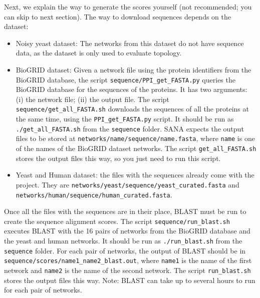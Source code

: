 \documentclass[]{article}
\begin{document}
Next, we explain the way to generate the scores yourself (not recommended; you can skip to next section). The way to download sequences depends on the dataset:
\begin{itemize}
\item Noisy yeast dataset: The networks from this dataset do not have sequence data, as the dataset is only used to evaluate topology.
\item BioGRID dataset: Given a network file using the protein identifiers from the BioGRID database, the script \texttt{sequence/PPI\_get\_FASTA.py} queries the BioGRID database for the sequences of the proteins. It has two arguments: (i) the network file; (ii) the output file. The script \texttt{sequence/get\_all\_FASTA.sh} downloads the sequences of all the proteins at the same time, using the \texttt{PPI\_get\_FASTA.py} script. It should be run as \texttt{./get\_all\_FASTA.sh} from the \texttt{sequence} folder. SANA expects the output files to be stored at \texttt{networks/name/sequence/name.fasta}, where \texttt{name} is one of the names of the BioGRID dataset networks. The script \texttt{get\_all\_FASTA.sh} stores the output files this way, so you just need to run this script.
\item Yeast and Human dataset: the files with the sequences already come with the project. They are \texttt{networks/yeast/sequence/yeast\_curated.fasta} and\\ \texttt{networks/human/sequence/human\_curated.fasta}.
\end{itemize}

Once all the files with the sequences are in their place, BLAST must be run to create the sequence alignment scores. The script \texttt{sequence/run\_blast.sh} executes BLAST with the 16 pairs of networks from the BioGRID database and the yeast and human networks. It should be run as \texttt{./run\_blast.sh} from the \texttt{sequence} folder. For each pair of networks, the output of BLAST should be in \texttt{sequence/scores/name1\_name2\_blast.out}, where \texttt{name1} is the name of the first network and \texttt{name2} is the name of the second network. The script \texttt{run\_blast.sh} stores the output files this way. Note: BLAST can take up to several hours to run for each pair of networks.
\end{document}
